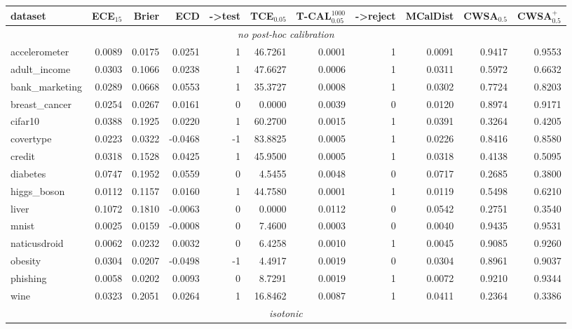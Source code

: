 \documentclass{article}
\theoremstyle{plain}
\theoremstyle{definition}
\theoremstyle{remark}
\begin{document}
\begin{table}[ht]
\centering
\scriptsize
\label{tab:report_4}
\begin{tabular}{lrrrrrrrrrr}
\toprule
dataset & ECE$_{15}$ & Brier & ECD  & ->test & TCE$_{0.05}$  & T-CAL$^{1000}_{0.05}$  & ->reject & MCalDist & CWSA$_{0.5}$ & CWSA$^{+}_{0.5}$ \\
\midrule
\multicolumn{11}{c}{\textit{no post-hoc calibration}} \\
\midrule
accelerometer & 0.0089 & 0.0175 & 0.0251 & 1 & 46.7261 & 0.0001 & 1 & 0.0091 & 0.9417 & 0.9553 \\
adult\_income & 0.0303 & 0.1066 & 0.0238 & 1 & 47.6627 & 0.0006 & 1 & 0.0311 & 0.5972 & 0.6632 \\
bank\_marketing & 0.0289 & 0.0668 & 0.0553 & 1 & 35.3727 & 0.0008 & 1 & 0.0302 & 0.7724 & 0.8203 \\
breast\_cancer & 0.0254 & 0.0267 & 0.0161 & 0 & 0.0000 & 0.0039 & 0 & 0.0120 & 0.8974 & 0.9171 \\
cifar10 & 0.0388 & 0.1925 & 0.0220 & 1 & 60.2700 & 0.0015 & 1 & 0.0391 & 0.3264 & 0.4205 \\
covertype & 0.0223 & 0.0322 & -0.0468 & -1 & 83.8825 & 0.0005 & 1 & 0.0226 & 0.8416 & 0.8580 \\
credit & 0.0318 & 0.1528 & 0.0425 & 1 & 45.9500 & 0.0005 & 1 & 0.0318 & 0.4138 & 0.5095 \\
diabetes & 0.0747 & 0.1952 & 0.0559 & 0 & 4.5455 & 0.0048 & 0 & 0.0717 & 0.2685 & 0.3800 \\
higgs\_boson & 0.0112 & 0.1157 & 0.0160 & 1 & 44.7580 & 0.0001 & 1 & 0.0119 & 0.5498 & 0.6210 \\
liver & 0.1072 & 0.1810 & -0.0063 & 0 & 0.0000 & 0.0112 & 0 & 0.0542 & 0.2751 & 0.3540 \\
mnist & 0.0025 & 0.0159 & -0.0008 & 0 & 7.4600 & 0.0003 & 0 & 0.0040 & 0.9435 & 0.9531 \\
naticusdroid & 0.0062 & 0.0232 & 0.0032 & 0 & 6.4258 & 0.0010 & 1 & 0.0045 & 0.9085 & 0.9260 \\
obesity & 0.0304 & 0.0207 & -0.0498 & -1 & 4.4917 & 0.0019 & 0 & 0.0304 & 0.8961 & 0.9037 \\
phishing & 0.0058 & 0.0202 & 0.0093 & 0 & 8.7291 & 0.0019 & 1 & 0.0072 & 0.9210 & 0.9344 \\
wine & 0.0323 & 0.2051 & 0.0264 & 1 & 16.8462 & 0.0087 & 1 & 0.0411 & 0.2364 & 0.3386 \\
\midrule
\multicolumn{11}{c}{\textit{isotonic}} \\

\end{tabular}
\end{table}
\end{document}
